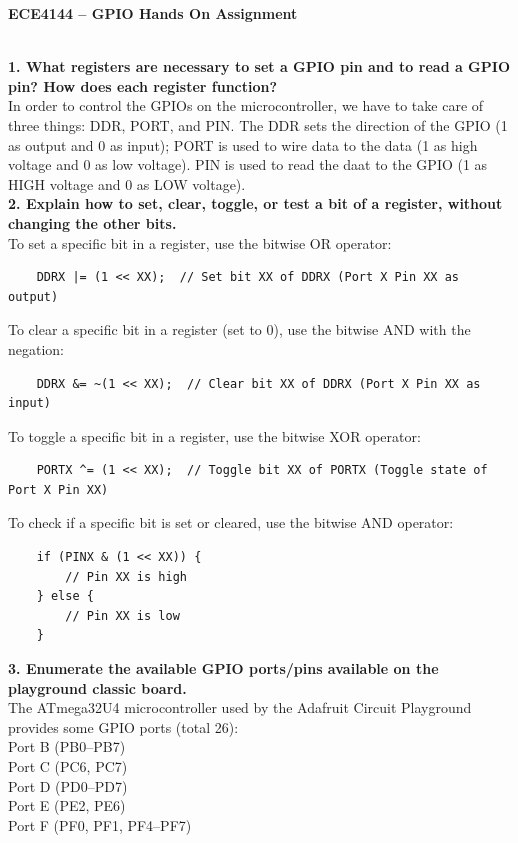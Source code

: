 \documentclass{article}
\begin{document}
\begin{minipage}{0.8\textwidth}
    \centering
    \Large
    \textbf{ECE4144 – GPIO Hands On Assignment}
\end{minipage}\\[1em]
\textbf{1. What registers are necessary to set a GPIO pin and to read a GPIO pin? How does each register
function?}\\[0.5em]
In order to control the GPIOs on the microcontroller, we have to take care of three things: DDR, PORT, and PIN. The DDR sets the direction of the GPIO (1 as output and 0 as input); PORT is used to wire data to the data (1 as high voltage and 0 as low voltage). PIN is used to read the daat to the GPIO (1 as HIGH voltage and 0 as LOW voltage). \\[1em]
\textbf{2. Explain how to set, clear, toggle, or test a bit of a register, without changing the other bits.}\\[0.5em]
To set a specific bit in a register, use the bitwise OR operator:
\begin{verbatim}
    DDRX |= (1 << XX);  // Set bit XX of DDRX (Port X Pin XX as output)
\end{verbatim}
To clear a specific bit in a register (set to 0), use the bitwise AND with the negation:
\begin{verbatim}
    DDRX &= ~(1 << XX);  // Clear bit XX of DDRX (Port X Pin XX as input)
\end{verbatim}
To toggle a specific bit in a register, use the bitwise XOR operator:
\begin{verbatim}
    PORTX ^= (1 << XX);  // Toggle bit XX of PORTX (Toggle state of Port X Pin XX)
\end{verbatim}
To check if a specific bit is set or cleared, use the bitwise AND operator:
\begin{verbatim}
    if (PINX & (1 << XX)) {
        // Pin XX is high
    } else {
        // Pin XX is low
    }
\end{verbatim}
\textbf{3. Enumerate the available GPIO ports/pins available on the playground classic board.}\\[0.5em]
The ATmega32U4 microcontroller used by the Adafruit Circuit Playground provides some GPIO ports (total 26):\\
Port B (PB0–PB7)\\
Port C (PC6, PC7)\\
Port D (PD0–PD7)\\
Port E (PE2, PE6)\\
Port F (PF0, PF1, PF4–PF7)\\[1em]
\end{document}
